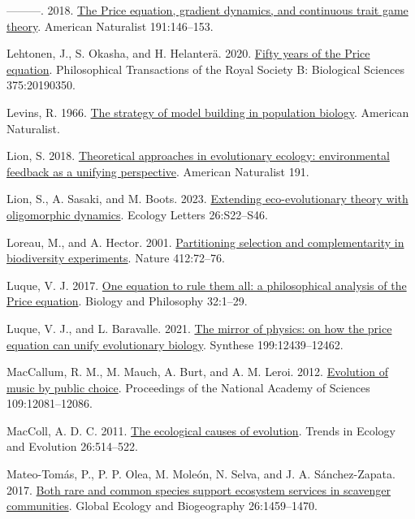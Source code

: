 \documentclass[
]{article}
\newlength{\cslhangindent}
\newenvironment{CSLReferences}[2] %
 {\begin{list}{}{%
  \setlength{\itemindent}{0pt}
  \setlength{\leftmargin}{0pt}
  \setlength{\parsep}{0pt}
  \ifodd #1
   \setlength{\leftmargin}{\cslhangindent}
   \setlength{\itemindent}{-1\cslhangindent}
  \fi
  \setlength{\itemsep}{#2\baselineskip}}}
 {\end{list}}
\begin{document}
\begin{CSLReferences}{0}{0}
---------. 2018. \href{https://doi.org/10.1086/694891}{{The Price
equation, gradient dynamics, and continuous trait game theory}}.
American Naturalist 191:146--153.

Lehtonen, J., S. Okasha, and H. Helanterä. 2020.
\href{https://doi.org/10.1098/rstb.2019.0350}{{Fifty years of the Price
equation}}. Philosophical Transactions of the Royal Society B:
Biological Sciences 375:20190350.

Levins, R. 1966. \href{https://doi.org/10.2307/27836590}{The strategy of
model building in population biology}. American Naturalist.

Lion, S. 2018. \href{https://doi.org/10.1086/694865}{{Theoretical
approaches in evolutionary ecology: environmental feedback as a unifying
perspective}}. American Naturalist 191.

Lion, S., A. Sasaki, and M. Boots. 2023.
\href{https://doi.org/10.1111/ele.14183}{Extending eco-evolutionary
theory with oligomorphic dynamics}. Ecology Letters 26:S22--S46.

Loreau, M., and A. Hector. 2001.
\href{https://doi.org/10.1038/35083573}{{Partitioning selection and
complementarity in biodiversity experiments}}. Nature 412:72--76.

Luque, V. J. 2017. \href{https://doi.org/10.1007/s10539-016-9538-y}{{One
equation to rule them all: a philosophical analysis of the Price
equation}}. Biology and Philosophy 32:1--29.

Luque, V. J., and L. Baravalle. 2021.
\href{https://doi.org/10.1007/s11229-021-03339-6}{{The mirror of
physics: on how the price equation can unify evolutionary biology}}.
Synthese 199:12439--12462.

MacCallum, R. M., M. Mauch, A. Burt, and A. M. Leroi. 2012.
\href{https://doi.org/10.5061/dryad.h0228}{{Evolution of music by public
choice}}. Proceedings of the National Academy of Sciences
109:12081--12086.

MacColl, A. D. C. 2011.
\href{https://doi.org/10.1016/j.tree.2011.06.009}{{The ecological causes
of evolution}}. Trends in Ecology and Evolution 26:514--522.

Mateo-Tomás, P., P. P. Olea, M. Moleón, N. Selva, and J. A.
Sánchez-Zapata. 2017. \href{https://doi.org/10.1111/geb.12673}{{Both
rare and common species support ecosystem services in scavenger
communities}}. Global Ecology and Biogeography 26:1459--1470.


\end{CSLReferences}
\end{document}
